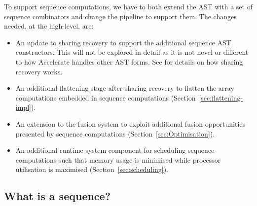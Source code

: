 To support sequence computations, we have to both extend the AST with a set of sequence combinators and change the pipeline to support them. The changes needed, at the high-level, are:
%
\begin{itemize}
%
\item An update to sharing recovery to support the additional sequence AST constructors. This will not be explored in detail as it is not novel or different to how Accelerate handles other AST forms. See \citet{McDonell:acc-optim} for details on how sharing recovery works.
%
\item An additional flattening stage after sharing recovery to flatten the array computations embedded in sequence computations (Section~\ref{sec:flattening-impl}).
%
\item An extension to the fusion system to exploit additional fusion opportunities presented by sequence computations (Section~\ref{sec:Optimisation}).
%
\item An additional runtime system component for scheduling sequence computations such that memory usage is minimised while processor utilisation is maximised (Section~\ref{sec:scheduling}).
%
\end{itemize}



\subsection{What is a sequence?}

